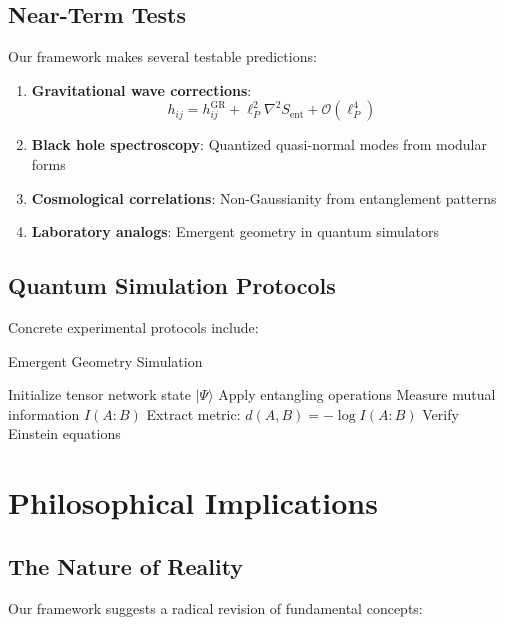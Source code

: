 \documentclass[12pt,a4paper]{article}
\theoremstyle{plain}
\theoremstyle{definition}
\theoremstyle{remark}
\begin{document}
\subsection{Near-Term Tests}

Our framework makes several testable predictions:

\begin{enumerate}
\item \textbf{Gravitational wave corrections}:
\[h_{ij} = h_{ij}^{\text{GR}} + \ell_P^2 \nabla^2 S_{\text{ent}} + \mathcal{O}(\ell_P^4)\]

\item \textbf{Black hole spectroscopy}: Quantized quasi-normal modes from modular forms

\item \textbf{Cosmological correlations}: Non-Gaussianity from entanglement patterns

\item \textbf{Laboratory analogs}: Emergent geometry in quantum simulators
\end{enumerate}

\subsection{Quantum Simulation Protocols}

Concrete experimental protocols include:

\begin{algorithm}
\caption{Emergent Geometry Simulation}
\begin{algorithmic}
\STATE Initialize tensor network state $|\Psi\rangle$
    \STATE Apply entangling operations
    \STATE Measure mutual information $I(A:B)$
    \STATE Extract metric: $d(A,B) = -\log I(A:B)$
    \STATE Verify Einstein equations
\ENDFOR
\end{algorithmic}
\end{algorithm}

\section{Philosophical Implications}

\subsection{The Nature of Reality}

Our framework suggests a radical revision of fundamental concepts:
\end{document}
